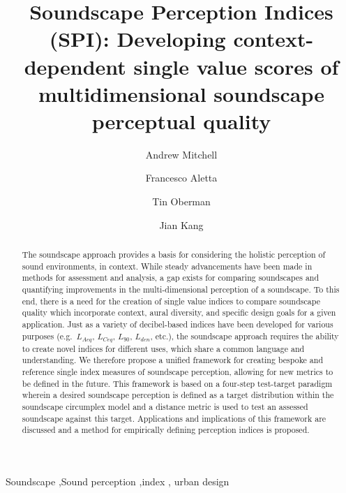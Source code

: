\documentclass[
  authoryear,
  preprint,
  3p]{elsarticle}
\begin{document}
\begin{frontmatter}
\title{Soundscape Perception Indices (SPI): Developing context-dependent
single value scores of multidimensional soundscape perceptual quality}
\author[1]{Andrew Mitchell%
%
}
\author[1]{Francesco Aletta%
%
}
\author[1]{Tin Oberman%
%
}
\author[]{Jian Kang%
%
}






        
\begin{abstract}
The soundscape approach provides a basis for considering the holistic
perception of sound environments, in context. While steady advancements
have been made in methods for assessment and analysis, a gap exists for
comparing soundscapes and quantifying improvements in the
multi-dimensional perception of a soundscape. To this end, there is a
need for the creation of single value indices to compare soundscape
quality which incorporate context, aural diversity, and specific design
goals for a given application. Just as a variety of decibel-based
indices have been developed for various purposes (e.g.~\(L_{Aeq}\),
\(L_{Ceq}\), \(L_{90}\), \(L_{den}\), etc.), the soundscape approach
requires the ability to create novel indices for different uses, which
share a common language and understanding. We therefore propose a
unified framework for creating bespoke and reference single index
measures of soundscape perception, allowing for new metrics to be
defined in the future. This framework is based on a four-step
test-target paradigm wherein a desired soundscape perception is defined
as a target distribution within the soundscape circumplex model and a
distance metric is used to test an assessed soundscape against this
target. Applications and implications of this framework are discussed
and a method for empirically defining perception indices is proposed.
\end{abstract}





\begin{keyword}
    Soundscape \sep Sound perception \sep index \sep 
    urban design
\end{keyword}
\end{frontmatter}
    
\end{document}
